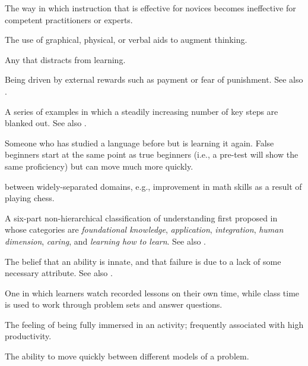 \begin{description}
 The way in which
instruction that is effective for novices becomes ineffective for competent
practitioners or experts.

 The use of graphical,
physical, or verbal aids to augment thinking.

 Any 
that distracts from learning.

 Being driven by external
rewards such as payment or fear of punishment. See
also .

 A series of examples in which a steadily
increasing number of key steps are blanked out. See
also .

 Someone who has studied a language
before but is learning it again. False beginners start at the same point as true
beginners (i.e., a pre-test will show the same proficiency) but can move much
more quickly.

 
between widely-separated domains, e.g., improvement in math skills as a result
of playing chess.

 A six-part non-hierarchical
classification of understanding first proposed in~\cite{Fink2013} whose
categories are \emph{foundational knowledge}, \emph{application},
\emph{integration}, \emph{human dimension}, \emph{caring}, and \emph{learning
  how to learn}. See also .

 The belief that an ability is innate,
and that failure is due to a lack of some necessary attribute. See also
.

 One in which learners watch
recorded lessons on their own time, while class time is used to work through
problem sets and answer questions.

 The feeling of being fully immersed in an activity;
frequently associated with high productivity.

 The ability to move
quickly between different models of a problem.


\end{description}
